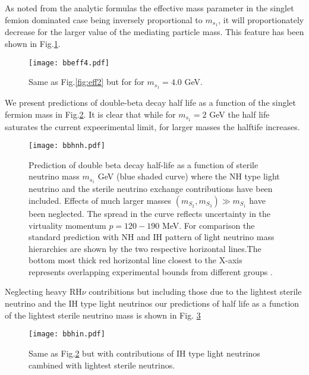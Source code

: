 \documentclass[a4paper,11pt]{article}
\begin{document}
As noted from the analytic formulas the effective mass parameter in
the singlet femion dominated case being inversely proportional to
$m_{s_1}$, it will proportionately decrease for the larger value of
the mediating particle mass. This feature has been shown in Fig.\ref{fig:eff4}.
\begin{figure}[htbp]
 \texttt{[image: bbeff4.pdf]}
 \caption{Same as Fig.\ref{fig:eff2} but for for $m_{s_1}=4.0$ GeV. }   
\label{fig:eff4}
\end{figure}
We present predictions of double-beta decay half life as a function of
the singlet fermion mass in Fig.\ref{fig:bbls1}. It is clear that while for
$m_{s_1}=2$ GeV the half life saturates the current expeerimental
limit, for larger masses the halftife increases.
\begin{figure}[htbp]
 \texttt{[image: bbhnh.pdf]}
 \caption{Prediction of double beta decay half-life 
 as a function of
   sterile neutrino mass  $m_{s_1}$ GeV (blue shaded curve) where the NH type  light
   neutrino and the sterile neutrino exchange contributions
   have been included. Effects of much larger masses $(m_{S_2}, m_{S_3})\gg
   m_{S_1}$ have been neglected. The spread in the curve reflects uncertainty in the virtuality momentum $p=120-190$ MeV. For comparison the standard
   prediction with NH and IH pattern of light neutrino mass
   hierarchies are shown by the two respective horizontal lines.The
   bottom most thick red horizontal line closest to the X-axis represents 
    overlapping experimental bounds from different groups
   \cite{bbexpt1-Klapdoor, bbexpt2,bbexpt3}.  }   
\label{fig:bbls1}
\end{figure}
Neglecting heavy RH$\nu$ contribitions but including those due to the lightest
sterile neutrino and the IH type light neutrinos our predictions of
half life as a function of the lightest sterile neutrino mass is shown
in Fig. \ref{fig:bbIH}  

\begin{figure}[htbp]
 \texttt{[image: bbhin.pdf]}
 \caption{Same as Fig.\ref{fig:bbls1} but with contributions of IH type light neutrinos cambined with lightest sterile neutrinos.}
\label{fig:bbIH}
\end{figure}
\end{document}
